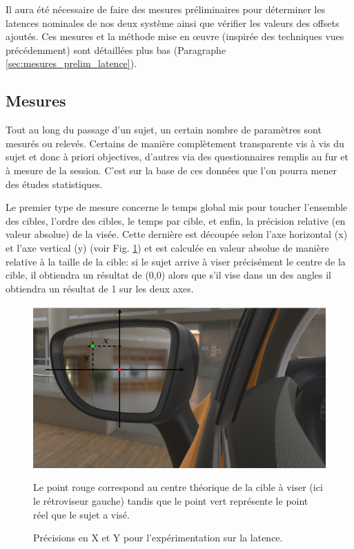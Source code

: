 	\par Il aura été nécessaire de faire des mesures préliminaires pour déterminer les latences nominales de nos deux système ainsi que vérifier les valeurs des offsets ajoutés. Ces mesures et la méthode mise en œuvre (inspirée des techniques vues précédemment) sont détaillées plus bas (Paragraphe \ref{sec:mesures_prelim_latence}).
	
	\subsection{Mesures}
	\par Tout au long du passage d'un sujet, un certain nombre de paramètres sont mesurés ou relevés. Certains de manière complètement transparente vis à vis du sujet et donc à priori objectives, d'autres via des questionnaires remplis au fur et à mesure de la session. C'est sur la base de ces données que l'on pourra mener des études statistiques.
	
	\par Le premier type de mesure concerne le temps global mis pour toucher l'ensemble des cibles, l'ordre des cibles, le temps par cible, et enfin, la précision relative (en valeur absolue) de la visée. Cette dernière est découpée selon l'axe horizontal (x) et l'axe vertical (y) (voir Fig. \ref{fig:x_y_precision_latency}) et est calculée en valeur absolue de manière relative à la taille de la cible: si le sujet arrive à viser précisément le centre de la cible, il obtiendra un résultat de (0,0) alors que s'il vise dans un des angles il obtiendra un résultat de 1 sur les deux axes.
	
	\begin{figure}
		\centering
		\includegraphics[scale=.65]{Figures/XYPrecision}
		\caption{Précisions en X et Y pour l'expérimentation sur la latence.}{Le point rouge correspond au centre théorique de la cible à viser (ici le rétroviseur gauche) tandis que le point vert représente le point réel que le sujet a visé.}
		\label{fig:x_y_precision_latency}
	\end{figure}
	
